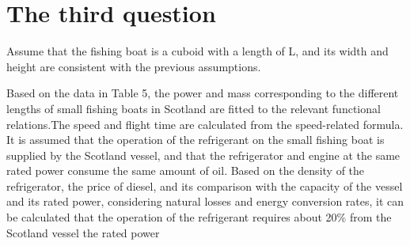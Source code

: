 \documentclass{mcmthesis}
\begin{document}
  \begin{figure}[h]
    \centering
    
    \centering
    \caption{}
  \end{figure}
  
\section{The third question}

Assume that the fishing boat is a cuboid with a length of L, and its width and height are consistent with the previous assumptions.

Based on the data in Table 5, the power and mass corresponding to the different lengths of small fishing boats in Scotland are fitted to the relevant functional relations.The speed and flight time are calculated from the speed-related formula.
It is assumed that the operation of the refrigerant on the small fishing boat is supplied by the Scotland vessel, and that the refrigerator and engine at the same rated power consume the same amount of oil. Based on the density of the refrigerator, the price of diesel, and its comparison with the capacity of the vessel and its rated power, considering natural losses and energy conversion rates, it can be calculated that the operation of the refrigerant requires about 20\%  from the Scotland vessel the rated power
\end{document}
